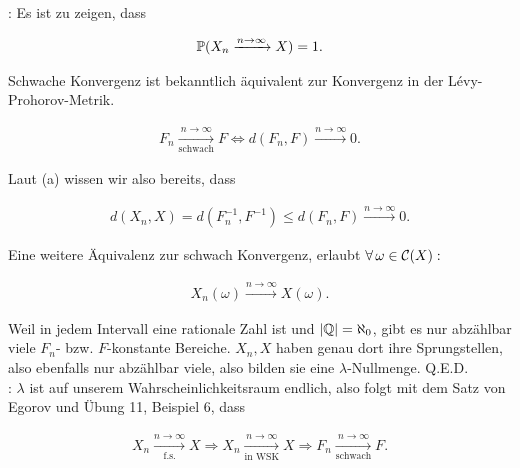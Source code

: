 \begin{solution}
\say{$\Rightarrow$}: Es ist zu zeigen, dass

\begin{align*}
  \P(X_n \xrightarrow{n \to \infty} X) = 1.
\end{align*}

Schwache Konvergenz ist bekanntlich äquivalent zur Konvergenz in der Lévy-Prohorov-Metrik.

\begin{align*}
  F_n \xrightarrow[\text{schwach}]{n \to \infty} F
  \Leftrightarrow
  d(F_n, F) \xrightarrow{n \to \infty} 0.
\end{align*}

Laut (a) wissen wir also bereits, dass

\begin{align*}
  d(X_n, X) =
  d(F_n^{-1}, F^{-1}) \leq
  d(F_n, F) \xrightarrow{n \to \infty} 0.
  \label{schwache_konvergenz}
\end{align*}

Eine weitere Äquivalenz zur schwach Konvergenz, erlaubt $\Forall \omega \in \mathcal{C}(X):$

\begin{align*}
  X_n(\omega) \xrightarrow{n \to \infty} X(\omega).
\end{align*}

Weil in jedem Intervall eine rationale Zahl ist und $|\Q| = \aleph_0$, gibt es nur abzählbar viele $F_n$- bzw. $F$-konstante Bereiche. $X_n, X$ haben genau dort ihre Sprungstellen, also ebenfalls nur abzählbar viele, also bilden sie eine $\lambda$-Nullmenge. Q.E.D. \\

\say{$\Leftarrow$}: $\lambda$ ist auf unserem Wahrscheinlichkeitsraum endlich, also folgt mit dem Satz von Egorov und Übung 11, Beispiel 6, dass

\begin{align*}
  X_n \xrightarrow[\text{f.s.}]{n \to \infty} X
  \Rightarrow
  X_n \xrightarrow[\text{in WSK}]{n \to \infty} X
  \Rightarrow
  F_n \xrightarrow[\text{schwach}]{n \to \infty} F.
\end{align*}

\end{solution}
